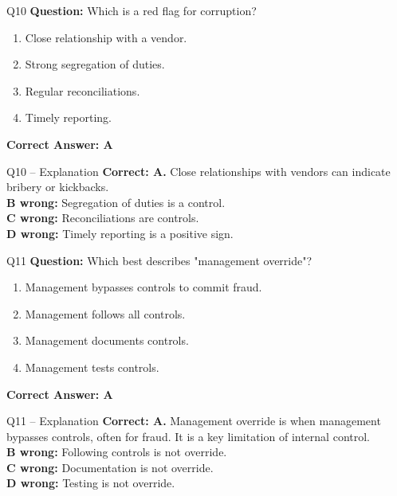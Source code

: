 \documentclass[aspectratio=169,10pt]{beamer}
\begin{document}
	\begin{frame}[t]{Q10}
		\small
		\textbf{Question:} Which is a red flag for corruption?
		\begin{enumerate}[label=\Alph*.,itemsep=1pt,topsep=2pt]
			\item Close relationship with a vendor.
			\item Strong segregation of duties.
			\item Regular reconciliations.
			\item Timely reporting.
		\end{enumerate}
		\vspace{4pt}
		\textbf{Correct Answer: A}
	\end{frame}
	
	\begin{frame}[t]{Q10 -- Explanation}
		\small
		\textbf{Correct: A.} Close relationships with vendors can indicate bribery or kickbacks. \\[4pt]
		\textbf{B wrong:} Segregation of duties is a control. \\[2pt]
		\textbf{C wrong:} Reconciliations are controls. \\[2pt]
		\textbf{D wrong:} Timely reporting is a positive sign.
	\end{frame}
	
	\begin{frame}[t]{Q11}
		\small
		\textbf{Question:} Which best describes "management override"?
		\begin{enumerate}[label=\Alph*.,itemsep=1pt,topsep=2pt]
			\item Management bypasses controls to commit fraud.
			\item Management follows all controls.
			\item Management documents controls.
			\item Management tests controls.
		\end{enumerate}
		\vspace{4pt}
		\textbf{Correct Answer: A}
	\end{frame}
	
	\begin{frame}[t]{Q11 -- Explanation}
		\small
		\textbf{Correct: A.} Management override is when management bypasses controls, often for fraud. It is a key limitation of internal control. \\[4pt]
		\textbf{B wrong:} Following controls is not override. \\[2pt]
		\textbf{C wrong:} Documentation is not override. \\[2pt]
		\textbf{D wrong:} Testing is not override.
	\end{frame}
	
\end{document}
